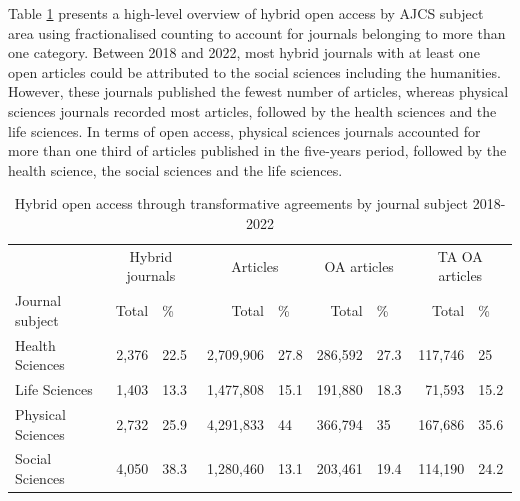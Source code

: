 \documentclass[a4paper,man,floatsintext,longtable,noextraspace,12pt]{apa6}
\begin{document}
Table \ref{tab:subject_summary_table} presents a high-level overview of
hybrid open access by AJCS subject area using fractionalised counting to
account for journals belonging to more than one category. Between 2018
and 2022, most hybrid journals with at least one open articles could be
attributed to the social sciences including the humanities. However,
these journals published the fewest number of articles, whereas physical
sciences journals recorded most articles, followed by the health
sciences and the life sciences. In terms of open access, physical
sciences journals accounted for more than one third of articles
published in the five-years period, followed by the health science, the
social sciences and the life sciences.

\begin{table}[H]

\caption{\label{tab:subject_summary_table}Hybrid open access through transformative agreements by journal subject 2018-2022}
\centering
\begin{tabular}[t]{lrlrlrlrl}
\toprule
\multicolumn{1}{c}{ } & \multicolumn{2}{c}{Hybrid journals} & \multicolumn{2}{c}{Articles} & \multicolumn{2}{c}{OA articles} & \multicolumn{2}{c}{TA OA articles} \\
\cmidrule(l{3pt}r{3pt}){2-3} \cmidrule(l{3pt}r{3pt}){4-5} \cmidrule(l{3pt}r{3pt}){6-7} \cmidrule(l{3pt}r{3pt}){8-9}
Journal subject & Total & \% & Total & \% & Total & \% & Total & \%\\
\midrule
Health Sciences & 2,376 & 22.5 & 2,709,906 & 27.8 & 286,592 & 27.3 & 117,746 & 25\\
Life Sciences & 1,403 & 13.3 & 1,477,808 & 15.1 & 191,880 & 18.3 & 71,593 & 15.2\\
Physical Sciences & 2,732 & 25.9 & 4,291,833 & 44 & 366,794 & 35 & 167,686 & 35.6\\
Social Sciences & 4,050 & 38.3 & 1,280,460 & 13.1 & 203,461 & 19.4 & 114,190 & 24.2\\
\bottomrule
\end{tabular}
\end{table}
\end{document}
